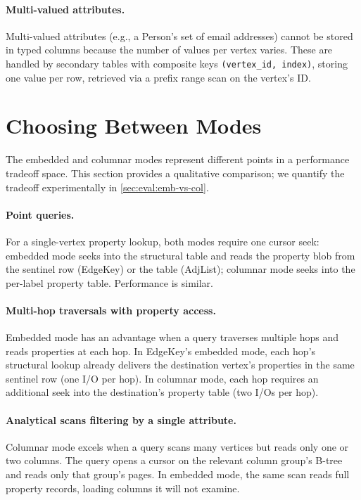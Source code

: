 \paragraph{Multi-valued attributes.}
Multi-valued attributes (e.g., a Person's set of email addresses) cannot be stored in typed columns because the number of values per vertex varies.
These are handled by secondary tables with composite keys \texttt{(vertex\_id, index)}, storing one value per row, retrieved via a prefix range scan on the vertex's ID.

\section{Choosing Between Modes}
\label{arch:prop-choosing}

The embedded and columnar modes represent different points in a performance tradeoff space.
This section provides a qualitative comparison; we quantify the tradeoff experimentally in \autoref{sec:eval:emb-vs-col}.

\paragraph{Point queries.}
For a single-vertex property lookup, both modes require one cursor seek: embedded mode seeks into the structural table and reads the property blob from the sentinel row (EdgeKey) or the  table (AdjList); columnar mode seeks into the per-label property table.
Performance is similar.

\paragraph{Multi-hop traversals with property access.}
Embedded mode has an advantage when a query traverses multiple hops and reads properties at each hop.
In EdgeKey's embedded mode, each hop's structural lookup already delivers the destination vertex's properties in the same sentinel row (one I/O per hop).
In columnar mode, each hop requires an additional seek into the destination's property table (two I/Os per hop).

\paragraph{Analytical scans filtering by a single attribute.}
Columnar mode excels when a query scans many vertices but reads only one or two columns.
The query opens a cursor on the relevant column group's B-tree and reads only that group's pages.
In embedded mode, the same scan reads full property records, loading columns it will not examine.

